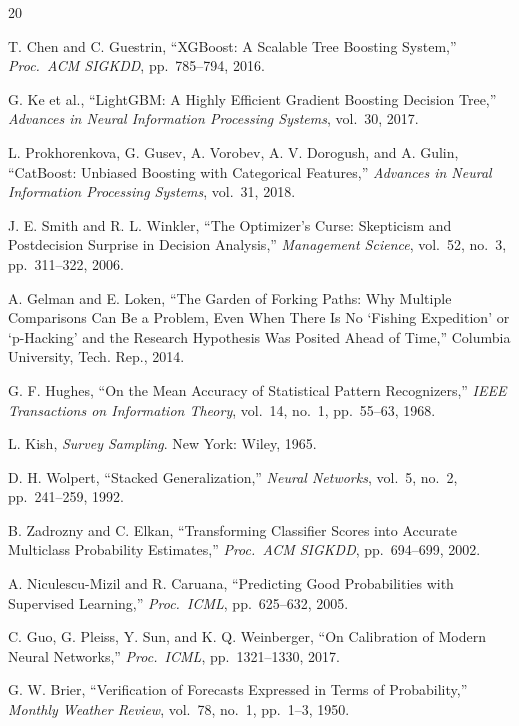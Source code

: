 \documentclass[conference]{IEEEtran}
\begin{document}

\begin{thebibliography}{20}

T. Chen and C. Guestrin, ``XGBoost: A Scalable Tree Boosting System,''
\textit{Proc.\ ACM SIGKDD}, pp.~785--794, 2016.

G. Ke et al., ``LightGBM: A Highly Efficient Gradient Boosting Decision Tree,''
\textit{Advances in Neural Information Processing Systems}, vol.~30, 2017.

L. Prokhorenkova, G. Gusev, A. Vorobev, A. V. Dorogush, and A. Gulin,
``CatBoost: Unbiased Boosting with Categorical Features,''
\textit{Advances in Neural Information Processing Systems}, vol.~31, 2018.

J. E. Smith and R. L. Winkler, ``The Optimizer's Curse: Skepticism and
Postdecision Surprise in Decision Analysis,''
\textit{Management Science}, vol.~52, no.~3, pp.~311--322, 2006.

A. Gelman and E. Loken, ``The Garden of Forking Paths: Why Multiple
Comparisons Can Be a Problem, Even When There Is No `Fishing
Expedition' or `p-Hacking' and the Research Hypothesis Was Posited
Ahead of Time,'' Columbia University, Tech. Rep., 2014.

G. F. Hughes, ``On the Mean Accuracy of Statistical Pattern
Recognizers,'' \textit{IEEE Transactions on Information Theory},
vol.~14, no.~1, pp.~55--63, 1968.

L. Kish, \textit{Survey Sampling}. New York: Wiley, 1965.

D. H. Wolpert, ``Stacked Generalization,''
\textit{Neural Networks}, vol.~5, no.~2, pp.~241--259, 1992.

B. Zadrozny and C. Elkan, ``Transforming Classifier Scores into
Accurate Multiclass Probability Estimates,''
\textit{Proc.\ ACM SIGKDD}, pp.~694--699, 2002.

A. Niculescu-Mizil and R. Caruana, ``Predicting Good Probabilities
with Supervised Learning,'' \textit{Proc.\ ICML}, pp.~625--632, 2005.

C. Guo, G. Pleiss, Y. Sun, and K. Q. Weinberger,
``On Calibration of Modern Neural Networks,''
\textit{Proc.\ ICML}, pp.~1321--1330, 2017.

G. W. Brier, ``Verification of Forecasts Expressed in Terms of
Probability,'' \textit{Monthly Weather Review}, vol.~78, no.~1,
pp.~1--3, 1950.


\end{thebibliography}
\end{document}
